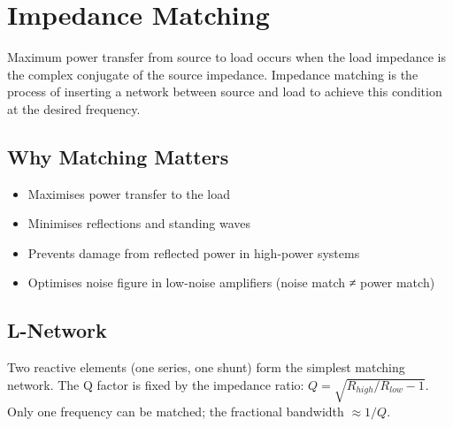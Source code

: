 \section{Impedance Matching}\label{sec:wiki_impedance_matching}



Maximum power transfer from source to load occurs when the load impedance is the complex conjugate of the source impedance. Impedance matching is the process of inserting a network between source and load to achieve this condition at the desired frequency.

				

\subsection{Why Matching Matters}

				
\begin{itemize}

					\item Maximises power transfer to the load

					\item Minimises reflections and standing waves

					\item Prevents damage from reflected power in high-power systems

					\item Optimises noise figure in low-noise amplifiers (noise match ≠ power match)

				
\end{itemize}

				

\subsection{L-Network}

				


				

Two reactive elements (one series, one shunt) form the simplest matching network. The Q factor is fixed by the impedance ratio: $Q = \sqrt{R_{high}/R_{low} - 1}$. Only one frequency can be matched; the fractional bandwidth $\approx 1/Q$.


